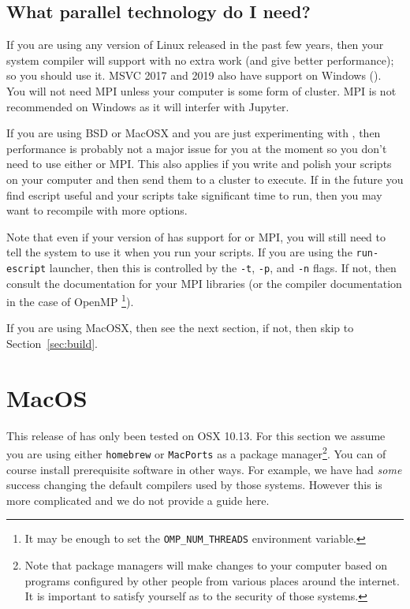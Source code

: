 \documentclass{esysdoc}
\begin{document}
\subsection{What parallel technology do I need?}\label{sec:needpar} If you are
using any version of Linux released in the past few years, then your system
compiler will support \openmp with no extra work (and give better performance);
so you should use it. MSVC 2017 and 2019 also have \openmp support on Windows
(). You will not need MPI unless your computer is some form of
cluster. MPI is not recommended on Windows as it will interfer with Jupyter.

If you are using BSD or MacOSX and you are just experimenting with \escript, then performance is
probably not a major issue for you at the moment so you don't need to use either \openmp or MPI.
This also applies if you write and polish your scripts on your computer and then send them to a cluster to execute.
If in the future you find escript useful and your scripts take significant time to run, then you may want to recompile
\escript with more options.



Note that even if your version of \escript has support for \openmp or MPI, you will still need to tell the system to
use it when you run your scripts.
If you are using the \texttt{run-escript} launcher, then this is controlled by
the \texttt{-t}, \texttt{-p}, and \texttt{-n} flags.
If not, then consult the documentation for your MPI libraries (or the compiler documentation in the case of OpenMP
\footnote{It may be enough to set the \texttt{OMP\_NUM\_THREADS} environment variable.}).

If you are using MacOSX, then see the next section, if not, then skip to Section~\ref{sec:build}.

\section{MacOS}
This release of \escript has only been tested on OSX 10.13.
For this section we assume you are using either \texttt{homebrew} or \texttt{MacPorts} as a package
manager\footnote{Note that package managers will make changes to your computer based on programs configured by other people from
various places around the internet. It is important to satisfy yourself as to the security of those systems.}.
You can of course install prerequisite software in other ways.
For example, we have had \emph{some} success changing the default
compilers used by those systems. However this is more complicated and we do not provide a guide here.
\end{document}
